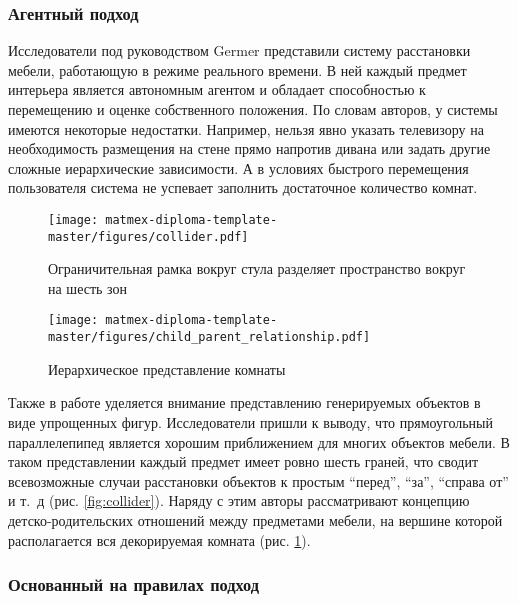 \subsubsection{Агентный подход}

Исследователи под руководством Germer \cite{germer2009procedural} представили систему расстановки мебели, работающую в режиме реального времени. В ней каждый предмет интерьера является автономным агентом и обладает способностью к перемещению и оценке собственного положения. По словам авторов, у системы имеются некоторые недостатки. Например, нельзя явно указать телевизору на необходимость размещения на стене прямо напротив дивана или задать другие сложные иерархические зависимости. А в условиях быстрого перемещения пользователя система не успевает заполнить достаточное количество комнат.

\begin{figure}
  \centering
  \begin{minipage}{0.45\textwidth}
    \texttt{[image: matmex-diploma-template-master/figures/collider.pdf]}
    \caption{Ограничительная рамка вокруг стула разделяет пространство вокруг на шесть зон}
    \label{fig:collider}
  \end{minipage}
  \hfill
  \begin{minipage}{0.45\textwidth}
    \texttt{[image: matmex-diploma-template-master/figures/child\_parent\_relationship.pdf]}
    \caption{Иерархическое представление комнаты}
    \label{fig:room_relationship}
  \end{minipage}
\end{figure}

Также в работе уделяется внимание представлению генерируемых объектов в виде упрощенных фигур. Исследователи пришли к выводу, что прямоугольный параллелепипед является хорошим приближением для многих объектов мебели. В таком представлении каждый предмет имеет ровно шесть граней, что сводит всевозможные случаи расстановки объектов к простым \enquote{перед}, \enquote{за}, \enquote{справа от} и т.~д (рис. \ref{fig:collider}). Наряду с этим авторы рассматривают концепцию детско-родительских отношений между предметами мебели, на вершине которой располагается вся декорируемая комната (рис. \ref{fig:room_relationship}).

\subsubsection{Основанный на правилах подход}

